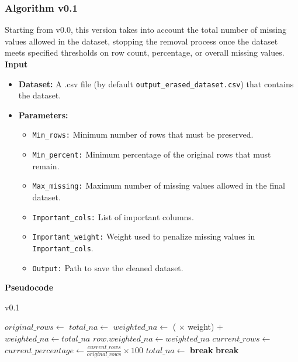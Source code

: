 \documentclass[a4paper,12pt]{article}
\begin{document}
\subsubsection{Algorithm v0.1}
Starting from v0.0, this version takes into account the total number of missing values allowed in the dataset, stopping the removal process once the dataset meets specified thresholds on row count, percentage, or overall missing values.\\
\textbf{Input}
\begin{itemize}
    \item \textbf{Dataset:} A .csv file (by default \texttt{output\_erased\_dataset.csv}) that contains the dataset.
    \item \textbf{Parameters:}
    \begin{itemize}
        \item \texttt{Min\_rows:} Minimum number of rows that must be preserved.
        \item \texttt{Min\_percent:} Minimum percentage of the original rows that must remain.
        \item \texttt{Max\_missing:} Maximum number of missing values allowed in the final dataset.
        \item \texttt{Important\_cols:} List of important columns.
        \item \texttt{Important\_weight:} Weight used to penalize missing values in \texttt{Important\_cols}.
        \item \texttt{Output:} Path to save the cleaned dataset.
    \end{itemize}
\end{itemize}



\textbf{Pseudocode}
\begin{algorithm}[H]
\caption{v0.1}
\begin{algorithmic}[1]
    \State $original\_rows \gets$ 
        \State $total\_na \gets$ 
            \State $weighted\_na \gets$ ( $\times$ weight) $+$ 
        \Else
            \State $weighted\_na \gets total\_na$
        \EndIf
        \State $row.weighted\_na \gets weighted\_na$
    \EndFor
    \State {}
        \State $current\_rows \gets$ 
        \State $current\_percentage \gets \frac{current\_rows}{original\_rows} \times 100$
        \State $total\_na \gets$ 
            \State \textbf{break}
        \EndIf
            \State \textbf{break}
        \EndIf
        \State {}
    \EndWhile
    \State {}
\EndFunction
\end{algorithmic}
\end{algorithm}
\end{document}
